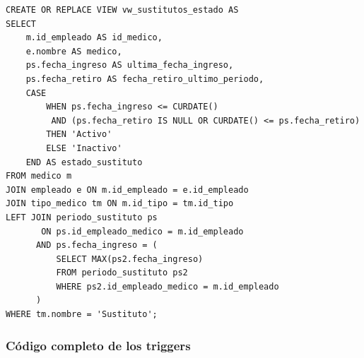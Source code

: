 \documentclass[12pt,a4paper]{article}
\begin{document}
{\small\begin{verbatim}
CREATE OR REPLACE VIEW vw_sustitutos_estado AS
SELECT
    m.id_empleado AS id_medico,
    e.nombre AS medico,
    ps.fecha_ingreso AS ultima_fecha_ingreso,
    ps.fecha_retiro AS fecha_retiro_ultimo_periodo,
    CASE
        WHEN ps.fecha_ingreso <= CURDATE()
         AND (ps.fecha_retiro IS NULL OR CURDATE() <= ps.fecha_retiro)
        THEN 'Activo'
        ELSE 'Inactivo'
    END AS estado_sustituto
FROM medico m
JOIN empleado e ON m.id_empleado = e.id_empleado
JOIN tipo_medico tm ON m.id_tipo = tm.id_tipo
LEFT JOIN periodo_sustituto ps
       ON ps.id_empleado_medico = m.id_empleado
      AND ps.fecha_ingreso = (
          SELECT MAX(ps2.fecha_ingreso)
          FROM periodo_sustituto ps2
          WHERE ps2.id_empleado_medico = m.id_empleado
      )
WHERE tm.nombre = 'Sustituto';
\end{verbatim}}

\subsubsection{C\'odigo completo de los triggers}
\end{document}
